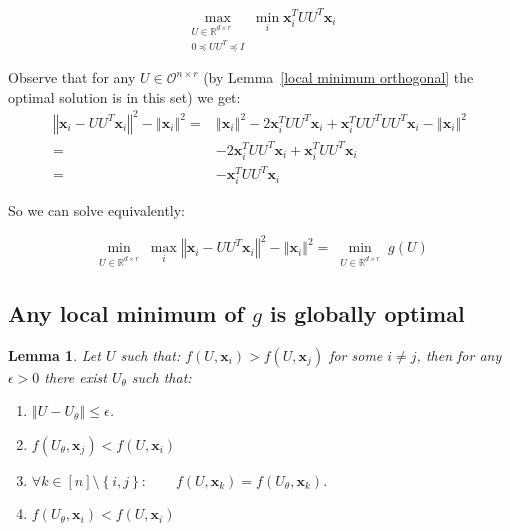 \documentclass{article}
\newtheorem{lemma}[theorem]{Lemma}
\newcommand{\Lemmaref}[1]{Lemma~\ref{#1}}
\newcommand{\x}{{\mathbf x}}
\newcommand{\R}{\mathbb{R}}
\begin{document}
\begin{equation} \label{factorized_problem}
\max_{\begin{array}{c}
U\in\R^{d\times r}\\
0\preceq UU^T\preceq I
\end{array}}\min_{{i}}\x_{i}^{T}UU^T\x_{i}
\end{equation}

Observe that for any $U\in\mathcal{O}^{n\times r}$ (by \Lemmaref{local minimum orthogonal} the optimal solution is in this set) we get:
\begin{align*}
    \left\Vert \x_i-UU^T\x_i\right\Vert^2- \left\Vert \x_{i}\right\Vert ^{2}
    =&\left\Vert \x_{i}\right\Vert^2-2\x_{i}^TUU^T\x_{i}+\x_{i}^TUU^TUU^T\x_{i}- \left\Vert \x_{i}\right\Vert^{2}\\
    =&-2\x_{i}^TUU^T\x_{i}+\x_{i}^TUU^T\x_{i}\\
    =&-\x_{i}^TUU^T\x_{i} 
\end{align*}

So we can solve equivalently:

\begin{equation} \label{factorized_problem_restore}
\min_{\begin{array}{c}
U\in\mathbb{R}^{d\times r}
\end{array}}\max_{i}\left\Vert \x_{i}-UU^T\x_{i}\right\Vert ^{2} - \left\Vert \x_{i}\right\Vert ^{2}=
\min_{\begin{array}{c}
U\in\mathbb{R}^{d\times r}
\end{array}}g(U)
\end{equation}


\subsection{Any local minimum of $g$ is globally optimal}

\begin{lemma} \label{not equal implies can improve}
Let $U$ such that: $f(U,\x_i)>f(U,\x_j)$ for some $i\ne j$, then for any $\epsilon>0$ there exist $U_{\theta}$ such that:
\begin{enumerate}
    \item $\left\Vert U-U_{\theta}\right\Vert \le\epsilon$.
    \item $f(U_{\theta},\x_j)<f(U,\x_i)$
    \item $\forall k\in[n]\setminus\left\{ i,j\right\} :\qquad f(U,\x_k)=f(U_{\theta},\x_k)$.
    \item $f(U_{\theta},\x_i)<f(U,\x_i)$
\end{enumerate}
\end{lemma}
\end{document}
